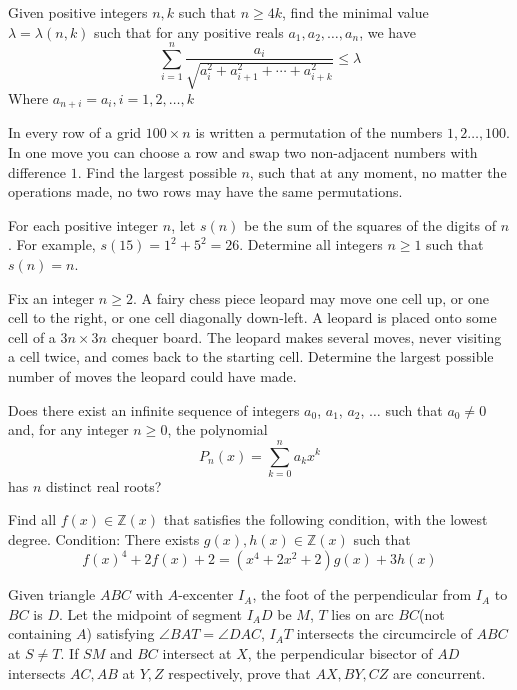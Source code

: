 \documentclass[11pt]{scrartcl}
\begin{document}
\begin{problem}[5607486140374329647]
Given positive integers $n, k$ such that $n\ge 4k$, find the minimal value $\lambda=\lambda(n,k)$ such that for any positive reals $a_1,a_2,\ldots,a_n$, we have
\[ \sum\limits_{i=1}^{n} {\frac{{a}_{i}}{\sqrt{{a}_{i}^{2}+{a}_{{i}+{1}}^{2}+{\cdots}{{+}}{a}_{{i}{+}{k}}^{2}}}}
\le \lambda\]Where $a_{n+i}=a_i,i=1,2,\ldots,k$
\end{problem}
\begin{problem}[5664985199661230516]
In every row of a grid $100 \times n$ is written a permutation of the numbers $1,2 \ldots, 100$. In one move you can choose a row and swap two non-adjacent numbers with difference $1$. Find the largest possible $n$, such that at any moment, no matter the operations made, no two rows may have the same permutations.
\end{problem}
\begin{problem}[5707875418806483255]
For each positive integer $n$, let $s(n)$ be the sum of the squares of the digits of $n$. For example, $s(15)=1^2+5^2=26$. Determine all integers $n\geq 1$ such that $s(n)=n$.
\end{problem}
\begin{problem}[5726273084626389998]
	Fix an integer $n \ge 2$. A fairy chess piece leopard may move one cell up, or one cell to the right, or one cell diagonally down-left. A leopard is placed onto some cell of a $3n \times 3n$ chequer board. The leopard makes several moves, never visiting a cell twice, and comes back to the starting cell. Determine the largest possible number of moves the leopard could have made.
\end{problem}
\begin{problem}[5757441138678056478]
Does there exist an infinite sequence of integers \(a_0\), \(a_1\), \(a_2\), \(\ldots\) such that \(a_0\ne0\) and, for any integer \(n\ge0\), the polynomial\[P_n(x)=\sum_{k=0}^na_kx^k\]has \(n\) distinct real roots?
\end{problem}
\begin{problem}[5790808043328490922]
Find all $f(x)\in \mathbb Z (x)$ that satisfies the following condition, with the lowest degree.
Condition: There exists $g(x),h(x)\in \mathbb Z (x)$ such that$$f(x)^4+2f(x)+2=(x^4+2x^2+2)g(x)+3h(x)$$
\end{problem}
\begin{problem}[5835156231907738776]
Given triangle $ABC$ with $A$-excenter $I_A$, the foot of the perpendicular from $I_A$ to $BC$ is $D$. Let the midpoint of segment $I_AD$ be $M$, $T$ lies on arc $BC$(not containing $A$) satisfying $\angle BAT=\angle DAC$, $I_AT$ intersects the circumcircle of $ABC$ at $S\neq T$. If $SM$ and $BC$ intersect at $X$, the perpendicular bisector of $AD$ intersects $AC,AB$ at $Y,Z$ respectively, prove that $AX,BY,CZ$ are concurrent.
\end{problem}
\end{document}
